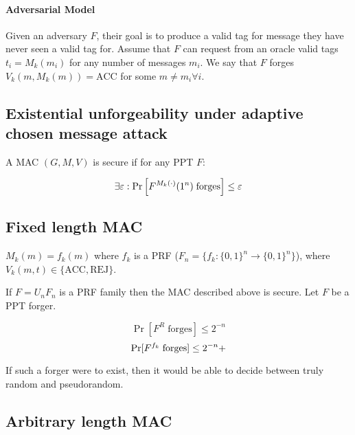 \documentclass{idc_msc}
\let\negligible\relax
\DeclareMathOperator*{\negligible}{\mathrm{neg}}
\begin{document}

\paragraph{Adversarial Model}

Given an adversary \(F\), their goal is to produce a valid tag for message they have never seen a valid tag for.
Assume that \(F\) can request from an oracle valid tags \(t_i = M_k(m_i)\) for any number of messages \(m_i\).
We say that \(F\) forges \(V_k(m, M_k(m)) = \mathrm{ACC}\) for some \(m \ne m_i \forall i\).

\subsection{Existential unforgeability under adaptive chosen message attack}

A MAC \((G,M,V)\) is secure if for any PPT \(F\):

\[
  \exists \negligible \varepsilon : \Pr\left[ F^{M_k(\cdot)}(1^n) \; \textrm{forges} \right] \le \varepsilon
\]


\subsection{Fixed length MAC}

\(M_k(m) = f_k(m)\) where \(f_k\) is a PRF (\(F_n=\{f_k:\{0,1\}^n \to \{0,1\}^n\}\)), where \(V_k(m, t) \in \{\mathrm{ACC}, \mathrm{REJ}\}\).

If \(F = U_n F_n\) is a PRF family then the MAC described above is secure.
Let \(F\) be a PPT forger.

\[
  \Pr[F^{R}\; \textrm{forges}] \le 2^{-n}
\]
\[
  \Pr[F^{f_k} \; \textrm{forges}] \le 2^{-n} + \negligible
\]

If such a forger were to exist, then it would be able to decide between truly random and pseudorandom.

\subsection{Arbitrary length MAC}
\end{document}
